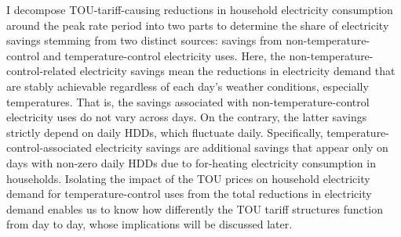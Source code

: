 I decompose TOU-tariff-causing reductions in household electricity consumption around the peak rate period into two parts to determine the share of electricity savings stemming from two distinct sources: savings from non-temperature-control and temperature-control electricity uses. Here, the non-temperature-control-related electricity savings mean the reductions in electricity demand that are stably achievable regardless of each day's weather conditions, especially temperatures. That is, the savings associated with non-temperature-control electricity uses do not vary across days. On the contrary, the latter savings strictly depend on daily HDDs, which fluctuate daily. Specifically, temperature-control-associated electricity savings are additional savings that appear only on days with non-zero daily HDDs due to for-heating electricity consumption in households. Isolating the impact of the TOU prices on household electricity demand for temperature-control uses from the total reductions in electricity demand enables us to know how differently the TOU tariff structures function from day to day, whose implications will be discussed later.

